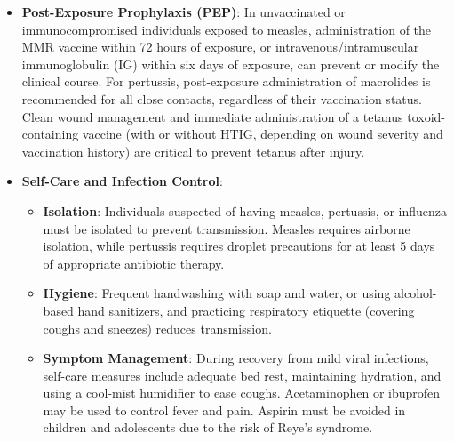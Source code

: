 \begin{itemize}
    \item \textbf{Post-Exposure Prophylaxis (PEP)}: In unvaccinated or immunocompromised individuals exposed to measles, administration of the MMR vaccine within 72 hours of exposure, or intravenous/intramuscular immunoglobulin (IG) within six days of exposure, can prevent or modify the clinical course. For pertussis, post-exposure administration of macrolides is recommended for all close contacts, regardless of their vaccination status. Clean wound management and immediate administration of a tetanus toxoid-containing vaccine (with or without HTIG, depending on wound severity and vaccination history) are critical to prevent tetanus after injury.
    \item \textbf{Self-Care and Infection Control}:
    \begin{itemize}
        \item \textbf{Isolation}: Individuals suspected of having measles, pertussis, or influenza must be isolated to prevent transmission. Measles requires airborne isolation, while pertussis requires droplet precautions for at least 5 days of appropriate antibiotic therapy.
        \item \textbf{Hygiene}: Frequent handwashing with soap and water, or using alcohol-based hand sanitizers, and practicing respiratory etiquette (covering coughs and sneezes) reduces transmission.
        \item \textbf{Symptom Management}: During recovery from mild viral infections, self-care measures include adequate bed rest, maintaining hydration, and using a cool-mist humidifier to ease coughs. Acetaminophen or ibuprofen may be used to control fever and pain. Aspirin must be avoided in children and adolescents due to the risk of Reye's syndrome.
    \end{itemize}
\end{itemize}

